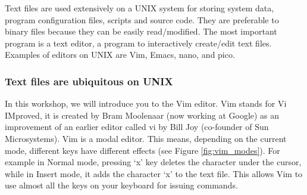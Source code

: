 \documentclass[a4paper]{beamer}
\newcommand{\ftitle}[1]{\frametitle<presentation>{#1}}
\begin{document}


Text files are used extensively on a UNIX system for storing system data,
program configuration files, scripts and source code. They are preferable to
binary files because they can be easily read/modified.  The most important
program is a text editor, a program to interactively create/edit text files.
Examples of editors on UNIX are Vim, Emacs, nano, and pico. 

\begin{frame}
\ftitle{Text files are ubiquitous on UNIX}
\end{frame}


In this workshop, we will introduce you to the Vim editor.  Vim stands for Vi
IMproved, it is created by Bram Moolenaar (now working at Google) as an
improvement of an earlier editor called vi by Bill Joy (co-founder of Sun
Microsystems).  Vim is a modal editor. This means, depending on the current
mode, different keys have different effects (see Figure \ref{fig:vim_modes}).  
For example in Normal mode, pressing `x' key deletes the character under the
cursor, while in Insert mode, it adds the character `x' to the text file. This
allows Vim to use almost all the keys on your keyboard for issuing commands.  
\end{document}
